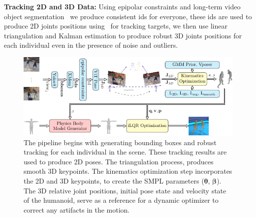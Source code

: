 \documentclass{egpubl}
\begin{document}
\textbf{Tracking 2D and 3D Data:} Using epipolar constraints and long-term video object segmentation~\cite{cheng2022xmem} we produce consistent ids for everyone, these ids are used to produce 2D joints positions using~\cite{xu2022vitpose} for tracking targets, we then use linear triangulation and Kalman estimation to produce robust 3D joints positions for each individual even in the presence of noise and outliers.   
\begin{figure}[!ht]
\includegraphics[width=0.75\linewidth]{pipeline.pdf}
 \centering
  \caption{The pipeline begins with generating bounding boxes  and robust tracking  for each individual in the scene. These tracking results are used to produce 2D poses. The triangulation process, produces smooth 3D keypoints. The kinematics optimization step incorporates the 2D and 3D keypoints, to create the SMPL parameters ($\mathbf{\theta}$, $\mathbf{\beta}$). The 3D relative joint positions, initial pose state  and velocity state of the humanoid, serve as a reference for a dynamic optimizer to correct any artifacts in the motion.}
  \label{fig:pipeline}
\end{figure}
\end{document}
